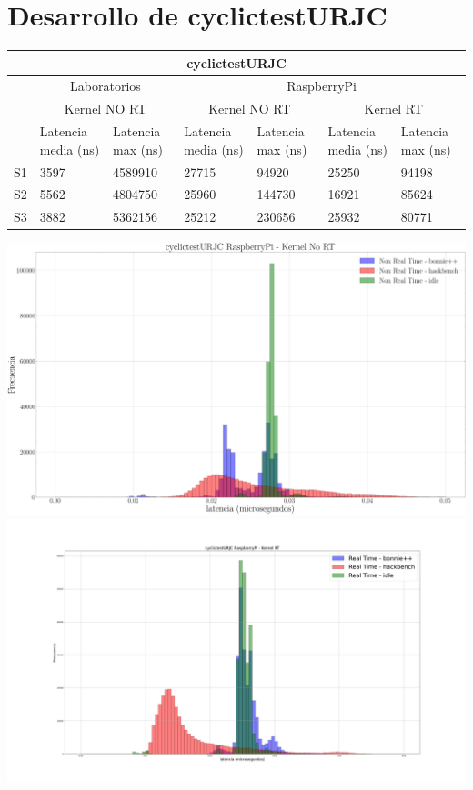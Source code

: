 \documentclass[12pt, a4paper]{report}
\begin{document}
	\chapter*{Desarrollo de cyclictestURJC}
	\begin{center}
		\setlength\extrarowheight{4pt}
		\begin{tabular}{ |p{1cm}|p{2cm}|p{2cm}|p{2cm}|p{2cm}|p{2cm}|p{2cm}| } 
			\hline
			\multicolumn{7}{|c|}{\textbf{cyclictestURJC}}\\ 
			\hline
			& \multicolumn{2}{|c|}{Laboratorios} & \multicolumn{4}{|c|}{RaspberryPi}\\ 
			\cline{2-7}
			& \multicolumn{2}{|c|}{Kernel NO RT} & \multicolumn{2}{|c|}{Kernel NO RT} & \multicolumn{2}{|c|}{Kernel RT}\\ 
			\cline{2-7}
			& Latencia media (ns) & Latencia max (ns)& Latencia media (ns) & Latencia max (ns)& Latencia media (ns) & Latencia max (ns)\\ 
			\hline
			S1 & 3597& 4589910& 27715&  94920& 25250& 94198\\ 
			\hline
			S2 & 5562& 4804750& 25960& 144730& 16921& 85624\\ 
			\hline
			S3 & 3882& 5362156& 25212& 230656& 25932& 80771\\ 
			\hline
		\end{tabular}
	\end{center}
	\begin{center}
		\includegraphics[width=\textwidth]{noRt}\\
		\includegraphics[width=\textwidth]{Rt}
	\end{center}
\end{document}
